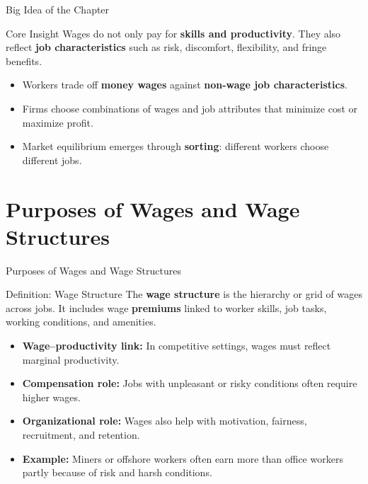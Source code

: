 \documentclass[aspectratio=169]{beamer}
\begin{document}
\begin{frame}{Big Idea of the Chapter}
\transfade
\begin{block}{Core Insight}
Wages do not only pay for \textbf{skills and productivity}. They also reflect \textbf{job characteristics} such as risk, discomfort, flexibility, and fringe benefits.
\end{block}
\begin{itemize}[<+->]
  \item Workers trade off \textbf{money wages} against \textbf{non-wage job characteristics}.
  \item Firms choose combinations of wages and job attributes that minimize cost or maximize profit.
  \item Market equilibrium emerges through \textbf{sorting}: different workers choose different jobs.
\end{itemize}
\end{frame}

\section{Purposes of Wages and Wage Structures}

\begin{frame}{Purposes of Wages and Wage Structures}
\transfade
\begin{block}{Definition: Wage Structure}
The \textbf{wage structure} is the hierarchy or grid of wages across jobs. It includes wage \textbf{premiums} linked to worker skills, job tasks, working conditions, and amenities.
\end{block}
\begin{itemize}[<+->]
  \item \textbf{Wage--productivity link:} In competitive settings, wages must reflect marginal productivity.
  \item \textbf{Compensation role:} Jobs with unpleasant or risky conditions often require higher wages.
  \item \textbf{Organizational role:} Wages also help with motivation, fairness, recruitment, and retention.
  \item \textbf{Example:} Miners or offshore workers often earn more than office workers partly because of risk and harsh conditions.
\end{itemize}
\end{frame}
\end{document}
